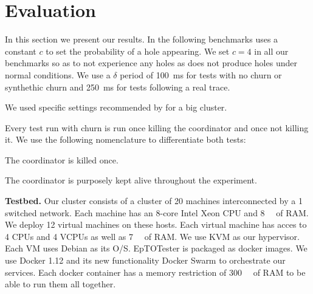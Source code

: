 
\section{Evaluation}
\label{sec:evaluation}
In this section we present our results. In the following benchmarks \epto uses a constant $c$ to set the probability of a hole appearing. We set $c = 4$ in all our benchmarks so as to not experience any holes as \jgroups does not produce holes under normal conditions. We use a $\delta$ period of \SI{100}{\milli\second} for tests with no churn or synthethic churn and \SI{250}{\milli\second} for tests following a real trace.
\par 
We used specific settings recommended by \jgroups for a big cluster.
\par
Every \jgroups test run with churn is run once killing the coordinator and once not killing it. We use the following nomenclature to differentiate both tests:
\begin{description}
	\item[\textbf{\jgroups-coord}:] The coordinator is killed once.
	\item[\textbf{\jgroups-nocoord}:] The coordinator is purposely kept alive throughout the experiment.
\end{description}
\par
\textbf{Testbed.} Our cluster consists of a cluster of 20 machines interconnected by a \SI{1}{\gbps} switched network. Each machine has an 8-core Intel Xeon CPU and \SI{8}{\giga\byte} of RAM. We deploy 12 virtual machines on these hosts. Each virtual machine has acces to 4 CPUs and 4 VCPUs as well as \SI{7}{\giga\byte} of RAM. We use KVM as our hypervisor. Each VM uses Debian as its O/S. EpTOTester is packaged as docker images. We use Docker 1.12 and its new functionality Docker Swarm to orchestrate our services. Each docker container has a memory restriction of \SI{300}{\mega\byte} of RAM to be able to run them all together.
\par
